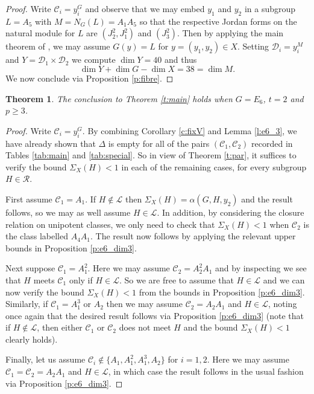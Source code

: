 \documentclass[twoside,a4paper,reqno,11pt]{amsart}
\renewcommand{\a}{\alpha}
\newcommand{\<}{\langle}
\renewcommand{\>}{\rangle}
\newcommand{\geqs}{\geqslant}
\renewcommand{\:}{\colon}
\theoremstyle{plain}
\newtheorem{thm}{Theorem}[section]
\theoremstyle{definition}
\begin{document}
\begin{proof}
Write $\mathcal{C}_i = y_i^G$ and observe that we may embed $y_1$ and $y_2$ in a subgroup $L = A_5$ with $M = N_G(L) = A_1A_5$ so that the respective Jordan forms on the natural module for $L$ are $(J_2^2,J_1^2)$ and $(J_3^2)$. Then by applying the main theorem of \cite{Ger}, we may assume $G(y) = L$ for $y = (y_1,y_2) \in X$. Setting $\mathcal{D}_i = y_i^M$ and $Y = \mathcal{D}_1 \times \mathcal{D}_2$ we compute $\dim Y = 40$ and thus 
\[
\dim Y + \dim G - \dim X = 38 = \dim M.
\]
We now conclude via Proposition \ref{p:fibre}.
\end{proof}

\begin{thm}\label{t:e6_2}
The conclusion to Theorem \ref{t:main} holds when $G = E_6$, $t=2$ and $p \geqs 3$.
\end{thm}

\begin{proof}
Write $\mathcal{C}_i = y_i^G$. By combining Corollary \ref{c:fixV} and Lemma \ref{l:e6_3}, we have already shown that $\Delta$ is empty for all of the pairs $(\mathcal{C}_1,\mathcal{C}_2)$ recorded in Tables \ref{tab:main} and \ref{tab:special}. So in view of Theorem \ref{t:par}, it suffices to verify the bound $\Sigma_X(H)<1$ in each of the remaining cases, for every subgroup $H \in \mathcal{R}$. 

First assume $\mathcal{C}_1 = A_1$. If $H \not\in \mathcal{L}$ then $\Sigma_X(H) = \a(G,H,y_2)$ and the result follows, so we may as well assume $H \in \mathcal{L}$. In addition, by  considering the closure relation on unipotent classes, we only need to check that $\Sigma_X(H)<1$ when $\mathcal{C}_2$ is the class labelled $A_4A_1$. The result now follows by applying the relevant upper bounds in Proposition \ref{p:e6_dim3}. 

Next suppose $\mathcal{C}_1 = A_1^2$. Here we may assume $\mathcal{C}_2 = A_2^2A_1$ and by inspecting \cite{Law2} we see that $H$ meets $\mathcal{C}_1$ only if $H \in \mathcal{L}$. So we are free to assume that $H \in \mathcal{L}$ and we can now verify the bound $\Sigma_X(H)<1$ from the bounds in Proposition \ref{p:e6_dim3}. Similarly, if $\mathcal{C}_1 = A_1^3$ or $A_2$ then we may assume $\mathcal{C}_2 = A_2A_1$ and $H \in \mathcal{L}$, noting once again that the desired result follows via Proposition \ref{p:e6_dim3} (note that if $H \not\in \mathcal{L}$, then either $\mathcal{C}_1$ or $\mathcal{C}_2$ does not meet $H$ and the bound $\Sigma_X(H)<1$ clearly holds).

Finally, let us assume $\mathcal{C}_i \not\in \{A_1,A_1^2,A_1^3,A_2\}$ for $i=1,2$. Here we may assume $\mathcal{C}_1 = \mathcal{C}_2 = A_2A_1$ and $H \in \mathcal{L}$, in which case the result follows in the usual fashion via Proposition \ref{p:e6_dim3}.
\end{proof}
\end{document}
